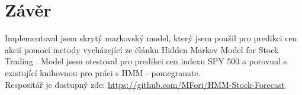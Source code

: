 \section{Závěr}

Implementoval jsem skrytý markovský model, který jsem použil pro predikci cen akcií pomocí metody vycházející ze článku Hidden Markov Model for Stock Trading \cite{Nguyen}. Model jsem otestoval pro predikci cen indexu SPY 500 a porovnal s existující knihovnou pro práci s HMM - pomegranate. \\

Respositář je dostupný zde: \href{https://github.com/MFori/HMM-Stock-Forecast}{https://github.com/MFori/HMM-Stock-Forecast}

\clearpage
